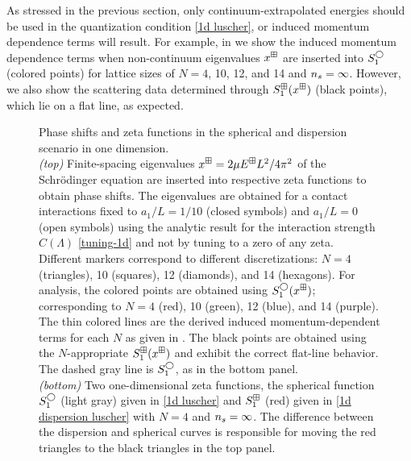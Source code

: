 As stressed in the previous section, only continuum-extrapolated energies should be used in the quantization condition \eqref{1d luscher}, or induced momentum dependence terms will result.
For example, in  we show the induced momentum dependence terms when non-continuum eigenvalues $x^\boxplus$ are inserted into $S^{\bigcirc}_1$ (colored points) for lattice sizes of $N=4$, 10, 12, and 14 and ${n_s}=\infty$.
However, we also show the scattering data determined through $S^{\boxplus}_1(x^\boxplus)$ (black points), which lie on a flat line, as expected.

\begin{figure}
\center
    \center
    
    \caption{
    	Phase shifts and zeta functions in the spherical and dispersion scenario in one dimension.
		\\
		\textit{(top)}
        	Finite-spacing eigenvalues $x^\boxplus=2\mu E^\boxplus L^2/4\pi^2$ of the Schr\"odinger equation are inserted into respective zeta functions to obtain phase shifts.
			The eigenvalues are obtained for a contact interactions fixed to $ a_{1}/L=1/10$ (closed symbols) and $a_{1}/L=0$ (open symbols) using the analytic result for the interaction strength $C(\Lambda)$ \eqref{tuning-1d} and not by tuning to a zero of any zeta.
			Different markers correspond to different discretizations: $N=4$ (triangles), 10 (squares), 12 (diamonds), and 14 (hexagons).
        	For analysis, the colored points are obtained using $S^\bigcirc_1(x^\boxplus)$; corresponding to $N=4$ (red), 10 (green), 12 (blue), and 14 (purple).
        	The thin colored lines are the derived induced momentum-dependent terms for each $N$ as given in .
        	The black points are obtained using the $N$-appropriate $S^{\boxplus}_1(x^\boxplus)$ and exhibit the correct flat-line behavior.
        	The dashed gray line is $S_1^\bigcirc$, as in the bottom panel.
        \\
        \textit{(bottom)}
        	Two one-dimensional zeta functions, the spherical function $S_1^{\bigcirc}$ (light gray) given in \eqref{1d luscher} and $S_1^{\boxplus}$ (red) given in \eqref{1d dispersion luscher} with $N=4$ and ${n_s}=\infty$.
        	The difference between the dispersion and spherical curves is responsible for moving the red triangles to the black triangles in the top panel.
        }
        \label{fig:luescher1d}
\end{figure}

